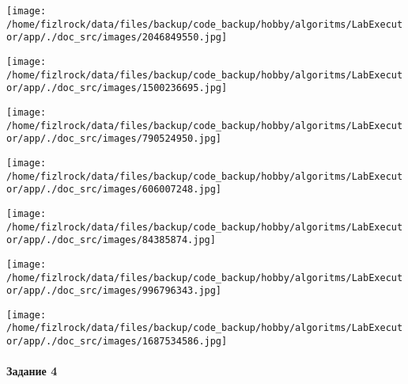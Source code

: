 \documentclass[a4paper, 12pt]{article}
\begin{document}
\texttt{[image: /home/fizlrock/data/files/backup/code\_backup/hobby/algoritms/LabExecutor/app/./doc\_src/images/2046849550.jpg]}

\texttt{[image: /home/fizlrock/data/files/backup/code\_backup/hobby/algoritms/LabExecutor/app/./doc\_src/images/1500236695.jpg]}

\texttt{[image: /home/fizlrock/data/files/backup/code\_backup/hobby/algoritms/LabExecutor/app/./doc\_src/images/790524950.jpg]}

\texttt{[image: /home/fizlrock/data/files/backup/code\_backup/hobby/algoritms/LabExecutor/app/./doc\_src/images/606007248.jpg]}

\texttt{[image: /home/fizlrock/data/files/backup/code\_backup/hobby/algoritms/LabExecutor/app/./doc\_src/images/84385874.jpg]}

\texttt{[image: /home/fizlrock/data/files/backup/code\_backup/hobby/algoritms/LabExecutor/app/./doc\_src/images/996796343.jpg]}

\texttt{[image: /home/fizlrock/data/files/backup/code\_backup/hobby/algoritms/LabExecutor/app/./doc\_src/images/1687534586.jpg]}
\pagebreak
\paragraph{Задание 4}
\end{document}
